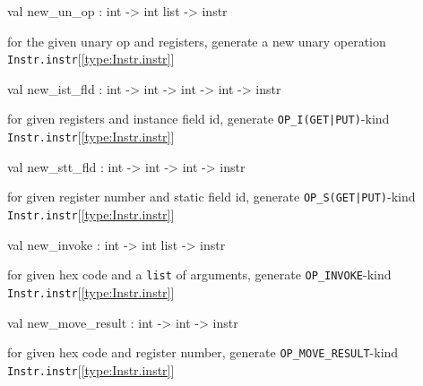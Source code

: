 \documentclass[11pt]{article}
\begin{document}
\label{val:Instr.new-underscoreun-underscoreop}\begin{ocamldoccode}
val new_un_op : int -> int list -> instr
\end{ocamldoccode}
\begin{ocamldocdescription}
for the given unary op and registers,
 generate a new unary operation {\tt{Instr.instr}}[\ref{type:Instr.instr}]


\end{ocamldocdescription}




\label{val:Instr.new-underscoreist-underscorefld}\begin{ocamldoccode}
val new_ist_fld : int -> int -> int -> int -> instr
\end{ocamldoccode}
\begin{ocamldocdescription}
for given registers and instance field id,
 generate {\tt{OP\_I(GET|PUT)}}-kind {\tt{Instr.instr}}[\ref{type:Instr.instr}]


\end{ocamldocdescription}




\label{val:Instr.new-underscorestt-underscorefld}\begin{ocamldoccode}
val new_stt_fld : int -> int -> int -> instr
\end{ocamldoccode}
\begin{ocamldocdescription}
for given register number and static field id,
 generate {\tt{OP\_S(GET|PUT)}}-kind {\tt{Instr.instr}}[\ref{type:Instr.instr}]


\end{ocamldocdescription}




\label{val:Instr.new-underscoreinvoke}\begin{ocamldoccode}
val new_invoke : int -> int list -> instr
\end{ocamldoccode}
\begin{ocamldocdescription}
for given hex code and a {\tt{list}} of arguments,
 generate {\tt{OP\_INVOKE}}-kind {\tt{Instr.instr}}[\ref{type:Instr.instr}]


\end{ocamldocdescription}




\label{val:Instr.new-underscoremove-underscoreresult}\begin{ocamldoccode}
val new_move_result : int -> int -> instr
\end{ocamldoccode}
\begin{ocamldocdescription}
for given hex code and register number,
 generate {\tt{OP\_MOVE\_RESULT}}-kind {\tt{Instr.instr}}[\ref{type:Instr.instr}]


\end{ocamldocdescription}
\end{document}
